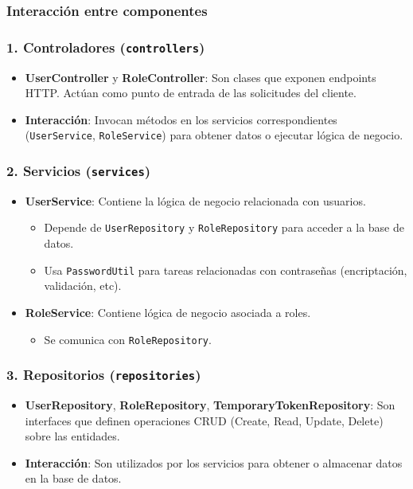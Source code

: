 \subsubsection{Interacción entre componentes}

\subsubsection*{1. Controladores (\texttt{controllers})}

\begin{itemize}
  \item \textbf{UserController} y \textbf{RoleController}: Son clases que exponen endpoints HTTP. Actúan como punto de entrada de las solicitudes del cliente.
  \item \textbf{Interacción}: Invocan métodos en los servicios correspondientes (\texttt{UserService}, \texttt{RoleService}) para obtener datos o ejecutar lógica de negocio.
\end{itemize}

\subsubsection*{2. Servicios (\texttt{services})}

\begin{itemize}
  \item \textbf{UserService}: Contiene la lógica de negocio relacionada con usuarios.
    \begin{itemize}
      \item Depende de \texttt{UserRepository} y \texttt{RoleRepository} para acceder a la base de datos.
      \item Usa \texttt{PasswordUtil} para tareas relacionadas con contraseñas (encriptación, validación, etc).
    \end{itemize}
  \item \textbf{RoleService}: Contiene lógica de negocio asociada a roles.
    \begin{itemize}
      \item Se comunica con \texttt{RoleRepository}.
    \end{itemize}
\end{itemize}

\subsubsection*{3. Repositorios (\texttt{repositories})}

\begin{itemize}
  \item \textbf{UserRepository}, \textbf{RoleRepository}, \textbf{TemporaryTokenRepository}: Son interfaces que definen operaciones CRUD (Create, Read, Update, Delete) sobre las entidades.
  \item \textbf{Interacción}: Son utilizados por los servicios para obtener o almacenar datos en la base de datos.
\end{itemize}

